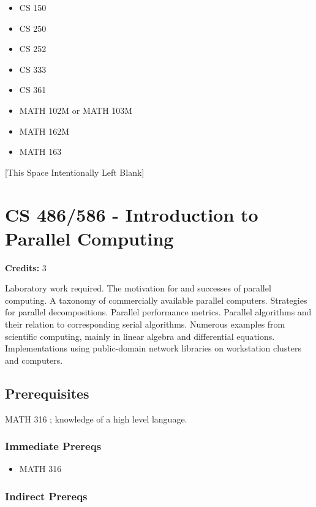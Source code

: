 \documentclass[]{article}
\providecommand{\tightlist}{%
  \setlength{\itemsep}{0pt}\setlength{\parskip}{0pt}}
\newcommand{\pagebreakhere}{
\vspace*{\fill}
\begin{center}
[This Space Intentionally Left Blank]
\end{center}
\vspace*{\fill}
\newpage
}
\begin{document}
\begin{itemize}
\tightlist
\item
  CS 150
\item
  CS 250
\item
  CS 252
\item
  CS 333
\item
  CS 361
\item
  MATH 102M or MATH 103M
\item
  MATH 162M
\item
  MATH 163
\end{itemize}

\pagebreakhere
\section{CS 486/586 - Introduction to Parallel
Computing}\label{cs-486586---introduction-to-parallel-computing}

\textbf{Credits:} 3

Laboratory work required. The motivation for and successes of parallel
computing. A taxonomy of commercially available parallel computers.
Strategies for parallel decompositions. Parallel performance metrics.
Parallel algorithms and their relation to corresponding serial
algorithms. Numerous examples from scientific computing, mainly in
linear algebra and differential equations. Implementations using
public-domain network libraries on workstation clusters and computers.

\subsection{Prerequisites}\label{prerequisites-49}

MATH 316 ; knowledge of a high level language.

\subsubsection{Immediate Prereqs}\label{immediate-prereqs-40}

\begin{itemize}
\tightlist
\item
  MATH 316
\end{itemize}

\subsubsection{Indirect Prereqs}\label{indirect-prereqs-40}
\end{document}
